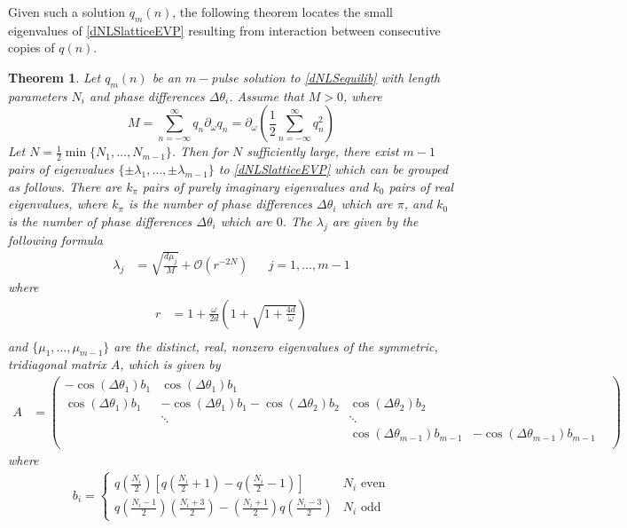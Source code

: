 \documentclass[12pt]{article}
\newtheorem{theorem}{Theorem}
\begin{document}
Given such a solution $q_m(n)$, the following theorem locates the small eigenvalues of \eqref{dNLSlatticeEVP} resulting from interaction between consecutive copies of $q(n)$. 

\begin{theorem}\label{dNLSeigtheorem}
Let $q_m(n)$ be an $m-$pulse solution to \eqref{dNLSequilib} with length parameters $N_i$ and phase differences $\Delta\theta_i$. Assume that $M > 0$, where
\[
M = \sum_{n=-\infty}^\infty q_n \partial_\omega q_n = \partial_\omega \left( \frac{1}{2} \sum_{n=-\infty}^\infty q_n^2 \right)
\]
Let $N = \frac{1}{2} \min\{ N_1, \dots, N_{m-1}\}$. Then for $N$ sufficiently large, there exist $m-1$ pairs of eigenvalues $\{\pm \lambda_1, \dots, \pm \lambda_{m-1}\}$ to \eqref{dNLSlatticeEVP} which can be grouped as follows. There are $k_\pi$ pairs of purely imaginary eigenvalues and $k_0$ pairs of real eigenvalues, where $k_\pi$ is the number of phase differences $\Delta\theta_i$ which are $\pi$, and $k_0$ is the number of phase differences $\Delta\theta_i$ which are $0$. The $\lambda_j$ are given by the following formula
\begin{align}\label{eigsDNLS}
\lambda_j &= \sqrt{\frac{d \mu_j}{M}} + \mathcal{O}(r^{-2N}) && j = 1, \dots, m-1
\end{align}
where 
\begin{align*}
r &= 1 + \frac{\omega}{2 d} \left( 1 + \sqrt{1 + \frac{4 d}{\omega}} \right)\\
\end{align*}
and $\{ \mu_1, \dots, \mu_{m-1} \}$ are the distinct, real, nonzero eigenvalues of the symmetric, tridiagonal matrix $A$, which is given by
\begin{align}\label{dNLSmatrixA}
A &= \begin{pmatrix}
-\cos(\Delta\theta_1) b_1 & \cos(\Delta\theta_1) b_1 & & &  \\
\cos(\Delta\theta_1) b_1 & -\cos(\Delta\theta_1) b_1 - \cos(\Delta\theta_2) b_2 & \cos(\Delta\theta_2) b_2 \\
& \ddots & \ddots \\
& &  \cos(\Delta\theta_{m-1}) b_{m-1} & -\cos(\Delta\theta_{m-1}) b_{m-1}  \\
\end{pmatrix}
\end{align}
where
\begin{align}\label{bieq}
b_i = \begin{cases}
q\left(\frac{N_i}{2}\right) \left[ q\left(\frac{N_i}{2} + 1\right) - q\left(\frac{N_i}{2} - 1\right) \right] & N_i \text{ even} \\
q\left(\frac{N_i-1}{2}\right)\left(\frac{N_i+3}{2}\right) 
- \left(\frac{N_i+1}{2}\right)q\left(\frac{N_i-3}{2}\right) & N_i \text{ odd}
\end{cases}
\end{align}
\end{theorem}
\end{document}
